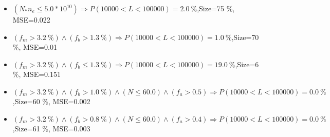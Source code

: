 \documentclass[numbered]{CSL}
\begin{document}
\begin{itemize}
\item $(N_* n_e \leq 5.0 * 10^{10}) \Rightarrow P(10 000 < L < 100 000) = 2.0~\%$,\hfill Size=75 \%, MSE=0.022
\item $(f_m > 3.2~\%) \land (f_b > 1.3~\%) \Rightarrow P(10 000 < L < 100 000) = 1.0~\%$,\hfill Size=70 \%, MSE=0.01
\item $(f_m > 3.2~\%) \land (f_b \leq 1.3~\%) \Rightarrow P(10 000 < L < 100 000) = 19.0~\%$,\hfill Size=6 \%, MSE=0.151
\item $(f_m > 3.2~\%) \land (f_b > 1.0~\%) \land (N \leq 60.0) \land (f_a > 0.5) \Rightarrow P(10 000 < L < 100 000) = 0.0~\%$,\hfill Size=60 \%, MSE=0.002
\item $(f_m > 3.2~\%) \land (f_b > 0.8~\%) \land (N \leq 60.0) \land (f_a > 0.4) \Rightarrow P(10 000 < L < 100 000) = 0.0~\%$,\hfill Size=61 \%, MSE=0.003
\end{itemize}
\end{document}
